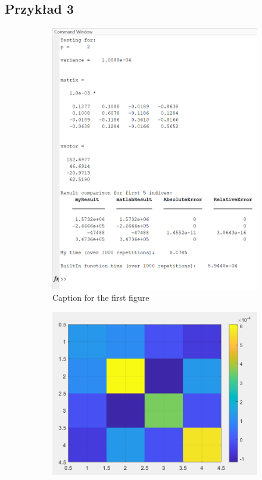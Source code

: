 \documentclass{article}
\begin{document}
    \subsection*{Przykład 3}
    \vspace{12pt}
    \begin{figure}[hbt!]
        \centering

        \begin{subfigure}{0.45\linewidth}
            \includegraphics[width=\linewidth]{img/fig3.png}
            \caption{Caption for the first figure}
        \end{subfigure}
        \hfill
        \begin{subfigure}{0.45\linewidth}
            \includegraphics[width=\linewidth]{img/mat3.png}

\end{subfigure}
\end{figure}
\end{document}
